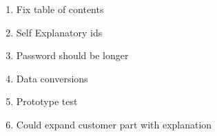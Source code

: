 \documentclass[a4paper]{article}
\begin{document}
\begin{enumerate}
			\item Fix table of contents
			\item Self Explanatory ids
			\item Password should be longer
			\item Data conversions
			\item Prototype test
			\item Could expand customer part with explanation

		\end{enumerate}		 
	
\end{document}
